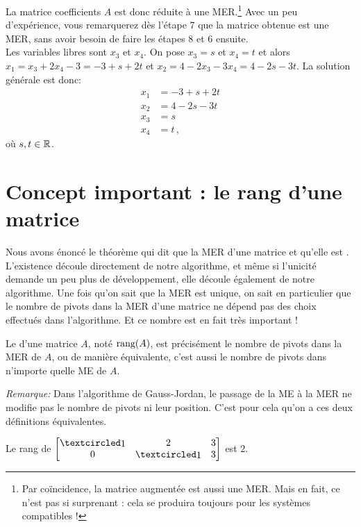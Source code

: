 \begin{myexample}
\begin{description}
\end{description}
La matrice coefficients $A$ est donc r\'eduite \`a une MER.\footnote{Par coïncidence, la matrice augmentée est aussi une MER. Mais en fait, ce n'est pas si surprenant : cela se produira toujours pour les systèmes compatibles !} Avec un peu d'expérience, vous remarquerez dès l'étape 7 que la matrice obtenue est une MER, sans avoir besoin de faire les étapes 8 et 6 ensuite. \\
 

Les variables libres sont $x_3$ et $x_4$. On pose $x_3 = s$ et $x_4 = t$ et alors $x_1 = x_3+2x_4-3 = -3+s+2t$ et
$x_2 = 4-2x_3-3x_4 = 4-2s-3t$.  La solution générale est donc:
\begin{align*}
x_1 &= -3+s+2t\\
x_2 &= 4-2s-3t\\
x_3 &= s \\
x_4 &= t\,,
\end{align*}
o\`u $s,t \in \mathbb{R}$.  
\end{myexample}


\section{Concept important : le rang d'une matrice}

Nous avons énoncé le théorème qui dit que la MER d'une matrice  et qu'elle est . L'existence découle directement de notre algorithme, et même si l'unicité demande un peu plus de d\'eveloppement, elle découle également de notre algorithme. Une fois qu'on sait que la MER est unique, 
on sait en particulier que le nombre de pivots dans la MER d'une matrice ne dépend pas des choix effectués dans l'algorithme.
Et ce nombre est en fait très important !
 
\begin{definition}  Le  d'une matrice $A$, noté $\textrm{rang}(A)$, est précisément le nombre de pivots dans la MER de $A$, ou de manière équivalente, c'est aussi le nombre de pivots dans n'importe quelle ME de $A$.
\end{definition}

\emph{Remarque:} Dans l'algorithme de Gauss-Jordan, le passage de la ME \`a la MER ne modifie pas le nombre de pivots ni leur position. C'est pour cela qu'on a ces deux définitions équivalentes.

\begin{myexample} Le rang de $\mat{\pivot & 2  & 3\\ 0 & \pivot  &3}$ est $2$.\end{myexample}

 

